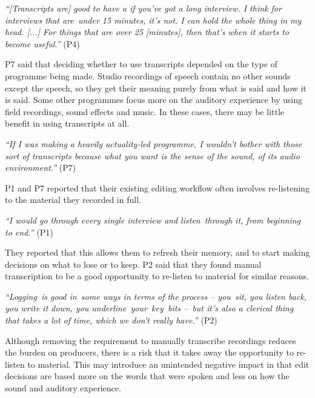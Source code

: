 \textit{``[Transcripts are] good to have a if you've got a long interview. I think for interviews that are under
15 minutes, it's not. I can hold the whole thing in my head. [...] For things that are over 25 [minutes], then that's
when it starts to become useful.''} (P4)

P7 said that deciding whether to use transcripts depended on the type of programme being made. Studio recordings of
speech contain no other sounds except the speech, so they get their meaning purely from what is said and how it is
said. Some other programmes focus more on the auditory experience by using field recordings, sound effects and music.
In these cases, there may be little benefit in using transcripts at all.

\textit{``If I was making a heavily actuality-led programme, I wouldn't bother with those sort of transcripts because
what you want is the sense of the sound, of its audio environment.''} (P7)




P1 and P7 reported that their existing editing workflow often involves re-listening to the material they recorded in
full.

\textit{``I would go through every single interview and listen through it, from beginning to end.''} (P1)

They reported that this allows them to refresh their memory, and to start making decisions on what to lose or to keep.
P2 said that they found manual transcription to be a good opportunity to re-listen to material for similar
reasons.

\textit{``Logging is good in some ways in terms of the process -- you sit, you listen back, you write it down, you
underline your key bits -- but it's also a clerical thing that takes a lot of time, which we don't really have.''} (P2)

Although removing the requirement to manually transcribe recordings reduces the burden on producers, there is a risk
that it takes away the opportunity to re-listen to material. This may introduce an unintended negative impact in that
edit decisions are based more on the words that were spoken and less on how the sound and auditory experience.

